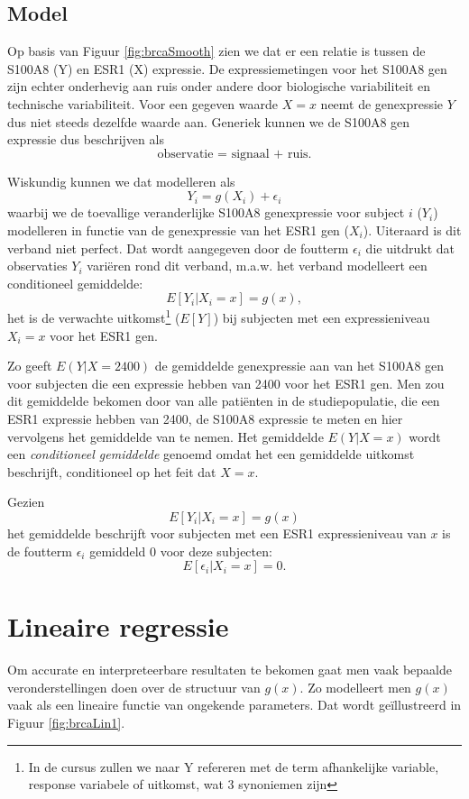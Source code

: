 \documentclass[12pt,dutch,coursenotes]{book}
\let\rmarkdownfootnote\footnote%
\def\footnote{\protect\rmarkdownfootnote}
\theoremstyle{definition}
\theoremstyle{definition}
\theoremstyle{definition}
\theoremstyle{remark}
\begin{document}
\subsection{Model}\label{model}

Op basis van Figuur \ref{fig:brcaSmooth} zien we dat er een relatie is
tussen de S100A8 (Y) en ESR1 (X) expressie. De expressiemetingen voor
het S100A8 gen zijn echter onderhevig aan ruis onder andere door
biologische variabiliteit en technische variabiliteit. Voor een gegeven
waarde \(X=x\) neemt de genexpressie \(Y\) dus niet steeds dezelfde
waarde aan. Generiek kunnen we de S100A8 gen expressie dus beschrijven
als \[\text{observatie = signaal + ruis.}\]

Wiskundig kunnen we dat modelleren als \[Y_i=g(X_i)+\epsilon_i\] waarbij
we de toevallige veranderlijke S100A8 genexpressie voor subject \(i\)
(\(Y_i\)) modelleren in functie van de genexpressie van het ESR1 gen
(\(X_i\)). Uiteraard is dit verband niet perfect. Dat wordt aangegeven
door de foutterm \(\epsilon_i\) die uitdrukt dat observaties \(Y_i\)
variëren rond dit verband, m.a.w. het verband modelleert een
conditioneel gemiddelde: \[E[Y_i|X_i=x]=g(x),\] het is de verwachte
uitkomst\footnote{In de cursus zullen we naar Y refereren met de term
  afhankelijke variable, response variabele of uitkomst, wat 3
  synoniemen zijn} (\(E[Y]\)) bij subjecten met een expressieniveau
\(X_i=x\) voor het ESR1 gen.

Zo geeft \(E(Y|X=2400)\) de gemiddelde genexpressie aan van het S100A8
gen voor subjecten die een expressie hebben van 2400 voor het ESR1 gen.
Men zou dit gemiddelde bekomen door van alle patiënten in de
studiepopulatie, die een ESR1 expressie hebben van 2400, de S100A8
expressie te meten en hier vervolgens het gemiddelde van te nemen. Het
gemiddelde \(E(Y|X=x)\) wordt een \emph{conditioneel gemiddelde} genoemd
omdat het een gemiddelde uitkomst beschrijft, conditioneel op het feit
dat \(X=x\).

Gezien \[E[Y_i|X_i=x]=g(x)\] het gemiddelde beschrijft voor subjecten
met een ESR1 expressieniveau van \(x\) is de foutterm \(\epsilon_i\)
gemiddeld 0 voor deze subjecten: \[E[\epsilon_i\vert X_i=x]=0.\]

\section{Lineaire regressie}\label{lineaire-regressie}

Om accurate en interpreteerbare resultaten te bekomen gaat men vaak
bepaalde veronderstellingen doen over de structuur van \(g(x)\). Zo
modelleert men \(g(x)\) vaak als een lineaire functie van ongekende
parameters. Dat wordt geïllustreerd in Figuur \ref{fig:brcaLin1}.
\end{document}
